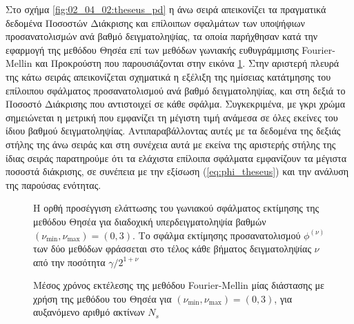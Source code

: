 Στο σχήμα \ref{fig:02_04_02:theseus_pd} η άνω σειρά απεικονίζει τα πραγματικά
δεδομένα Ποσοστών Διάκρισης και επίλοιπων σφαλμάτων των υποψήφιων
προσανατολισμών ανά βαθμό δειγματοληψίας, τα οποία παρήχθησαν κατά την εφαρμογή
της μεθόδου Θησέα επί των μεθόδων γωνιακής ευθυγράμμισης Fourier-Mellin και
Προκρούστη που παρουσιάζονται στην εικόνα \ref{fig:02_04_02:theseus}. Στην
αριστερή πλευρά της κάτω σειράς απεικονίζεται σχηματικά η εξέλιξη της ημίσειας
κατάτμησης του επίλοιπου σφάλματος προσανατολισμού ανά βαθμό δειγματοληψίας,
και στη δεξιά το Ποσοστό Διάκρισης που αντιστοιχεί σε κάθε σφάλμα.
Συγκεκριμένα, με γκρι χρώμα σημειώνεται η μετρική που εμφανίζει τη μέγιστη τιμή
ανάμεσα σε όλες εκείνες του ίδιου βαθμού δειγματοληψίας.  Αντιπαραβάλλοντας
αυτές με τα δεδομένα της δεξιάς στήλης της άνω σειράς και στη συνέχεια αυτά με
εκείνα της αριστερής στήλης της ίδιας σειράς παρατηρούμε ότι τα ελάχιστα
επίλοιπα σφάλματα εμφανίζουν τα μέγιστα ποσοστά διάκρισης, σε συνέπεια με την
εξίσωση (\ref{eq:phi_theseus}) και την ανάλυση της παρούσας ενότητας.

\begin{figure}[!h]\centering
  \vspace{1.0cm}
  
  \vspace{0.5cm}
  \caption{\small Η ορθή προσέγγιση ελάττωσης του γωνιακού σφάλματος εκτίμησης
           της μεθόδου Θησέα για διαδοχική υπερδειγματοληψία βαθμών
           $(\nu_{\min}, \nu_{\max}) = (0,3)$. Το σφάλμα εκτίμησης
           προσανατολισμού $\phi^{(\nu)}$ των δύο μεθόδων φράσσεται στο τέλος
           κάθε βήματος δειγματοληψίας $\nu$ από την ποσότητα
           $\gamma/2^{1+\nu}$}
  \label{fig:02_04_02:theseus}
\end{figure}

\begin{figure}[!h]\centering
  
  \caption{\small Μέσος χρόνος εκτέλεσης της μεθόδου Fourier-Mellin μίας
           διάστασης με χρήση της μεθόδου του Θησέα για
           $(\nu_{\min}, \nu_{\max}) = (0,3)$, για αυξανόμενο αριθμό ακτίνων
           $N_s$}
  \label{fig:02_04_02:theseus_exec_times}
\end{figure}

